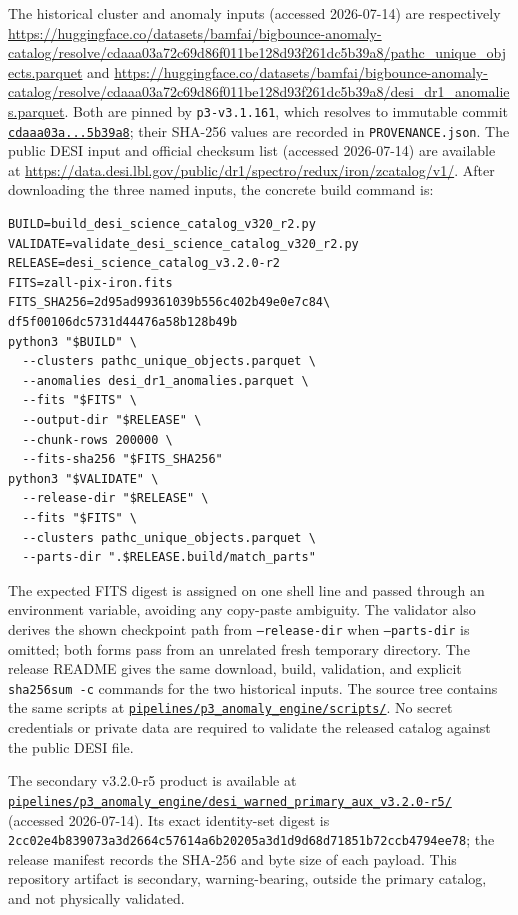 \documentclass[twocolumn]{aastex701}
\newcommand{\warnedAuxVersion}{v3.2.0-r5}
\begin{document}
The historical cluster and anomaly inputs (accessed 2026-07-14) are respectively
\url{https://huggingface.co/datasets/bamfai/bigbounce-anomaly-catalog/resolve/cdaaa03a72c69d86f011be128d93f261dc5b39a8/pathc_unique_objects.parquet}
and
\url{https://huggingface.co/datasets/bamfai/bigbounce-anomaly-catalog/resolve/cdaaa03a72c69d86f011be128d93f261dc5b39a8/desi_dr1_anomalies.parquet}.
Both are pinned by \texttt{p3-v3.1.161}, which resolves to immutable commit
\href{https://huggingface.co/datasets/bamfai/bigbounce-anomaly-catalog/tree/cdaaa03a72c69d86f011be128d93f261dc5b39a8}{\texttt{cdaaa03a...5b39a8}}; their SHA-256 values are recorded in
\texttt{PROVENANCE.json}.  The public DESI input and official checksum list (accessed 2026-07-14) are available at
\url{https://data.desi.lbl.gov/public/dr1/spectro/redux/iron/zcatalog/v1/}.  After downloading the
three named inputs, the concrete build command is:
\begingroup
\scriptsize
\begin{verbatim}
BUILD=build_desi_science_catalog_v320_r2.py
VALIDATE=validate_desi_science_catalog_v320_r2.py
RELEASE=desi_science_catalog_v3.2.0-r2
FITS=zall-pix-iron.fits
FITS_SHA256=2d95ad99361039b556c402b49e0e7c84\
df5f00106dc5731d44476a58b128b49b
python3 "$BUILD" \
  --clusters pathc_unique_objects.parquet \
  --anomalies desi_dr1_anomalies.parquet \
  --fits "$FITS" \
  --output-dir "$RELEASE" \
  --chunk-rows 200000 \
  --fits-sha256 "$FITS_SHA256"
python3 "$VALIDATE" \
  --release-dir "$RELEASE" \
  --fits "$FITS" \
  --clusters pathc_unique_objects.parquet \
  --parts-dir ".$RELEASE.build/match_parts"
\end{verbatim}
\endgroup
The expected FITS digest is assigned on one shell line and passed through an environment
variable, avoiding any copy-paste ambiguity.  The validator also derives the shown checkpoint
path from \texttt{--release-dir} when \texttt{--parts-dir} is omitted; both forms pass from an
unrelated fresh temporary directory.  The release README gives the same download, build,
validation, and explicit \texttt{sha256sum -c} commands for the two historical inputs.  The source tree contains the same
scripts at \href{https://github.com/Hubify-Projects/bigbounce/tree/main/pipelines/p3_anomaly_engine/scripts}{\nolinkurl{pipelines/p3_anomaly_engine/scripts/}}.  No secret credentials or private
data are required to validate the released catalog against the public DESI file.

The secondary \warnedAuxVersion{} product is available at
\href{https://github.com/Hubify-Projects/bigbounce/tree/main/pipelines/p3_anomaly_engine/desi_warned_primary_aux_v3.2.0-r5}{\nolinkurl{pipelines/p3_anomaly_engine/desi_warned_primary_aux_v3.2.0-r5/}}
(accessed 2026-07-14).  Its exact identity-set digest is
\texttt{2cc02e4b839073a3d2664c57614a6b20\allowbreak205a3d1d9d68d71851b72ccb4794ee78};
the release manifest records the SHA-256 and byte size of each payload.  This repository artifact
is secondary, warning-bearing, outside the primary catalog, and not physically validated.
\end{document}
